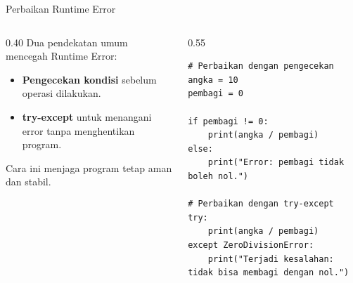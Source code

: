 \documentclass[aspectratio=169, table]{beamer}
\begin{document}
\begin{frame}[fragile]{Perbaikan Runtime Error}
\vspace{20pt}

\begin{columns}[T]
    \begin{column}{0.40\linewidth}
        Dua pendekatan umum mencegah Runtime Error:

        \begin{itemize}
            \item \textbf{Pengecekan kondisi} sebelum operasi dilakukan.
            \item \textbf{try-except} untuk menangani error tanpa menghentikan program.
        \end{itemize}

        Cara ini menjaga program tetap aman dan stabil.
    \end{column}

    \begin{column}{0.55\linewidth}
\begin{lstlisting}[style=PythonStyle, basicstyle=\ttfamily\scriptsize]
# Perbaikan dengan pengecekan
angka = 10
pembagi = 0

if pembagi != 0:
    print(angka / pembagi)
else:
    print("Error: pembagi tidak boleh nol.")

# Perbaikan dengan try-except
try:
    print(angka / pembagi)
except ZeroDivisionError:
    print("Terjadi kesalahan: tidak bisa membagi dengan nol.")
\end{lstlisting}
    \end{column}
\end{columns}

\end{frame}
\end{document}
